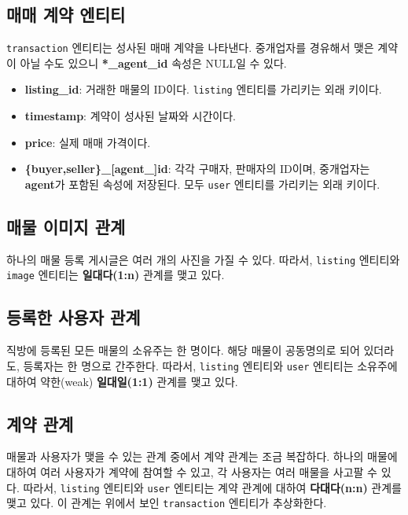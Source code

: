 \documentclass{article}
\newcommand\code[1]{
  \texttt{\large{#1}}
}
\begin{document}
\subsection{매매 계약 엔티티}

\code{transaction} 엔티티는 성사된 매매 계약을 나타낸다.
중개업자를 경유해서 맺은 계약이 아닐 수도 있으니 \textbf{*\_agent\_id} 속성은  NULL일 수 있다.

\begin{itemize}
\item \textbf{listing\_id}: 거래한 매물의 ID이다. \code{listing} 엔티티를 가리키는 외래 키이다.
\item \textbf{timestamp}: 계약이 성사된 날짜와 시간이다.
\item \textbf{price}: 실제 매매 가격이다.
\item \textbf{\{buyer,seller\}\_[agent\_]id}: 각각 구매자, 판매자의 ID이며, 중개업자는 \textbf{agent}가 포함된 속성에 저장된다. 모두 \code{user} 엔티티를 가리키는 외래 키이다.
\end{itemize}

\subsection{매물 이미지 관계}

하나의 매물 등록 게시글은 여러 개의 사진을 가질 수 있다.
따라서, \code{listing} 엔티티와 \code{image} 엔티티는 \textbf{일대다(1:n)} 관계를 맺고 있다.

\subsection{등록한 사용자 관계}

직방에 등록된 모든 매물의 소유주는 한 명이다.
해당 매물이 공동명의로 되어 있더라도, 등록자는 한 명으로 간주한다.
따라서, \code{listing} 엔티티와 \code{user} 엔티티는 소유주에 대하여 약한(weak) \textbf{일대일(1:1)} 관계를 맺고 있다.

\subsection{계약 관계}

매물과 사용자가 맺을 수 있는 관계 중에서 계약 관계는 조금 복잡하다.
하나의 매물에 대하여 여러 사용자가 계약에 참여할 수 있고, 각 사용자는 여러 매물을 사고팔 수 있다.
따라서, \code{listing} 엔티티와 \code{user} 엔티티는 계약 관계에 대하여 \textbf{다대다(n:n)} 관계를 맺고 있다.
이 관계는 위에서 보인 \code{transaction} 엔티티가 추상화한다.
\end{document}
